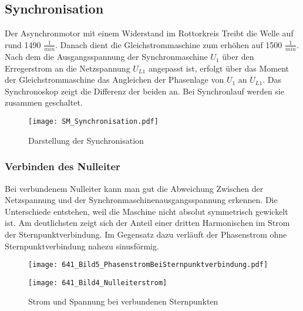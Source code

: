 \begin{flushleft}
\subsection{Synchronisation}
Der Asynchronmotor mit einem Widerstand im Rottorkreis Treibt die Welle auf rund 1490 $\frac{1}{min}$. Danach dient die Gleichstrommaschine zum erhöhen auf 1500 $\frac{1}{min}$. Nach dem die Ausgangsspannung der Synchronmaschine $U_1$ über den Erregerstrom an die Netzspannung $U_{L1}$ angepasst ist, erfolgt über das Moment der Gleichstrommaschine das Angleichen der Phasenlage von $U_1$ an $U_{L1}$. Das Synchronoskop zeigt die Differenz der beiden an. Bei Synchronlauf werden sie zusammen geschaltet. 
\vspace{0.3cm}
\begin{figure}[H]
    \centering
        \texttt{[image: SM\_Synchronisation.pdf]}
    \caption{Darstellung der Synchronisation}
    \label{fig:Synchronisation}
\end{figure}\vspace{0.3cm}
\subsubsection{Verbinden des Nulleiter}
Bei verbundenem Nulleiter kann man gut die Abweichung Zwischen der Netzspannung und der Synchronmaschinenausgangsspannung erkennen. Die Unterschiede entstehen, weil die Maschine nicht absolut symmetrisch gewickelt ist. Am deutlichsten zeigt sich der Anteil einer dritten Harmonischen im Strom der Sternpunktverbindung. Im Gegensatz dazu verläuft der Phasenstrom ohne Sternpunktverbindung nahezu sinusförmig.


\begin{figure}[H]
\begin{minipage}[t]{0.49\textwidth}
\centering
\texttt{[image: 641\_Bild5\_PhasenstromBeiSternpunktverbindung.pdf]}
\label{fig:PhasenstromSternpuntkverbunden}
\end{minipage}
\begin{minipage}[t]{0.49\textwidth}
\centering
\texttt{[image: 641\_Bild4\_Nulleiterstrom]}
    \label{fig:SternstromVerbunden}
\end{minipage}
\caption{Strom und Spannung bei verbundenen Sternpunkten}
\end{figure}






\end{flushleft}
